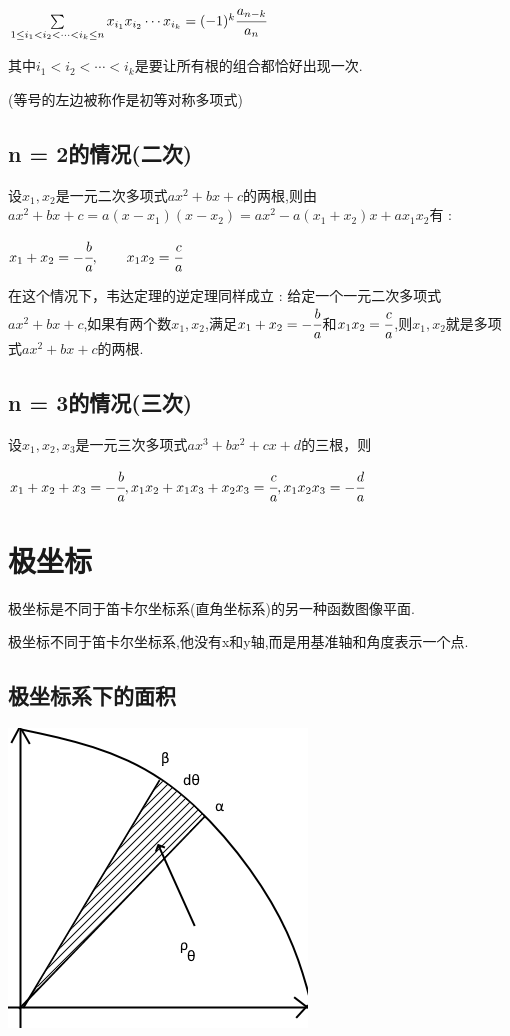 {{{$\sum\limits_{1 \leq i_1 < i_2 < \dotsm < i_k \leq n}x_{i_{1}}x_{i_{2}} \dotsm x_{i_{k}} = (-1)^k\cfrac{a_{n-k}}{a_n}$

其中$i_1 < i_2 < \dotsm < i_k$是要让所有根的组合都恰好出现一次.

(等号的左边被称作是初等对称多项式)
}%

\subsection{n = 2的情况(二次)}{
    设$x_1,x_2$是一元二次多项式$ax^2 + bx + c$的两根,则由$ax^2 +bx + c = a(x - x_1)(x - x_2) = ax^2 - a(x_1 + x_2)x + ax_1x_2$有 :

    $x_1 + x_2 = -\cfrac{b}{a},\qquad x_1x_2 = \cfrac{c}{a}$

    在这个情况下，韦达定理的逆定理同样成立 : 给定一个一元二次多项式$ax^2 + bx + c$,如果有两个数$x_1,x_2$,满足$x_1 + x_2 = -\cfrac{b}{a}$和$x_1x_2 = \cfrac{c}{a}$,则$x_1,x_2$就是多项式$ax^2 + bx + c$的两根.
}%

\subsection{n = 3的情况(三次)}{
    设$x_1,x_2,x_3$是一元三次多项式$ax^3 + bx^2 + cx + d$的三根，则

    $x_1 + x_2 + x_3 = -\cfrac{b}{a}, x_1x_2 + x_1x_3 + x_2x_3 = \cfrac{c}{a},x_1x_2x_3 = -\cfrac{d}{a}$
}%

}%

\section{极坐标}{
极坐标是不同于笛卡尔坐标系(直角坐标系)的另一种函数图像平面.

极坐标不同于笛卡尔坐标系,他没有x和y轴,而是用基准轴和角度表示一个点.

\subsection{极坐标系下的面积}{
    \begin{center}
        \includegraphics{resources/polar_coordness.png}
    \end{center}

}}}
